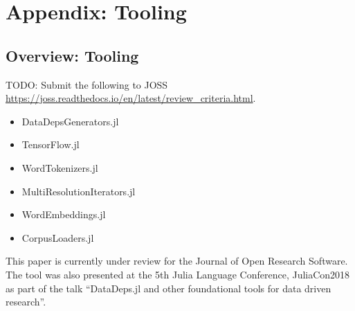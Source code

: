 \documentclass{book}
\begin{document}
	\part{Appendix: Tooling}
	
	\chapter{Overview: Tooling}
	TODO: Submit the following to JOSS	\url{https://joss.readthedocs.io/en/latest/review_criteria.html}.
	
	\begin{itemize}
		\item DataDepsGenerators.jl
		\item TensorFlow.jl
		\item WordTokenizers.jl
		\item MultiResolutionIterators.jl
		\item WordEmbeddings.jl
		\item CorpusLoaders.jl
	\end{itemize}
	
	
	\begin{preamble}
		This paper is currently under review for the Journal of Open Research Software.
		The tool was also presented at the 5th Julia Language Conference, JuliaCon2018
		as part of the talk ``DataDeps.jl and other foundational tools for data driven research''.
	\end{preamble}
	
\end{document}

